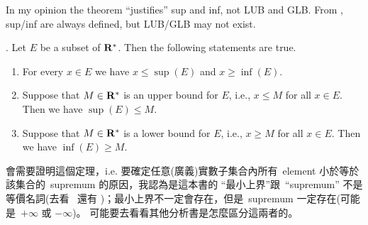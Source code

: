 \begin{note}
In my opinion the theorem ``justifies'' sup and inf, not LUB and GLB.
From , sup/inf are always defined, but LUB/GLB may not exist.
\end{note}

\begin{theorem} \label{thm 6.2.11}.
Let \(E\) be a subset of \(\mathbf{R}^*\).
Then the following statements are true.
\begin{enumerate}
    \item For every \(x \in E\) we have \(x \le \sup(E)\) and \(x \ge \inf(E)\).
    \item Suppose that \(M \in \mathbf{R}^*\) is an upper bound for \(E\), i.e., \(x \le M\) for all \(x \in E\).
          Then we have \(\sup(E) \le M\).
    \item Suppose that \(M \in \mathbf{R}^*\) is a lower bound for \(E\), i.e., \(x \ge M\) for all \(x \in E\).
          Then we have \(\inf(E) \ge M\).
\end{enumerate}
\end{theorem}

\begin{note}
會需要證明這個定理，i.e. 要確定任意(廣義)實數子集合內所有\ element 小於等於該集合的\ supremum 的原因，我認為是這本書的 ``最小上界''跟\ ``supremum'' 不是等價名詞(去看\  還有 )；最小上界不一定會存在，但是\ supremum 一定存在(可能是\ \(+\infty\) 或 \(-\infty\))。
可能要去看看其他分析書是怎麼區分這兩者的。
\end{note}

